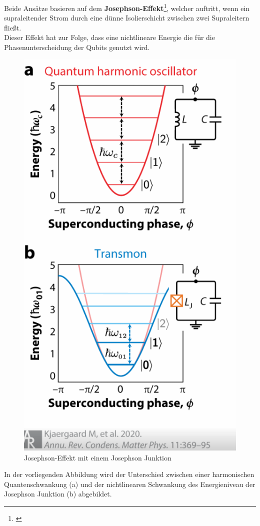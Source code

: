 Beide Ansätze basieren auf dem \textbf{Josephson-Effekt}\footnote{\cite{kjaergaard_superconducting_2020}}, welcher auftritt, wenn ein supraleitender Strom durch eine dünne Isolierschicht zwischen zwei Supraleitern fließt.\\
Dieser Effekt hat zur Folge, dass eine nichtlineare Energie die für die Phasenunterscheidung der Qubits genutzt wird.\\

\begin{figure}[H]
    \centering
    \includegraphics[width=0.75\linewidth]{img/JJ.png}
    \caption{Josephson-Effekt mit einem Josephson Junktion \cite{kjaergaard_superconducting_2020}}
    \label{fig:Josephson-junktion}
\end{figure}

In der vorliegenden Abbildung wird der Unterschied zwischen einer harmonischen Quantenschwankung (a) und der nichtlinearen Schwankung des Energieniveau der Josephson Junktion (b) abgebildet.\\

